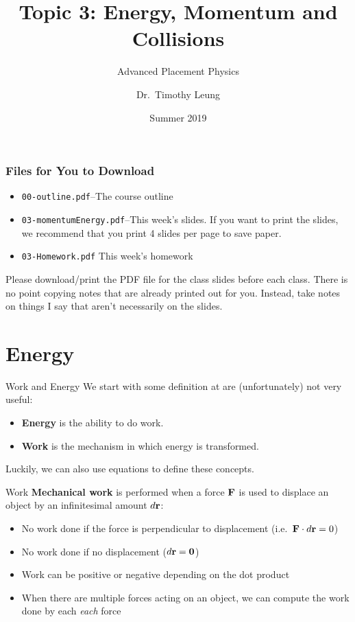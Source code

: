\documentclass[12pt,compress,aspectratio=169]{beamer}
\title{Topic 3: Energy, Momentum and Collisions}
\subtitle{Advanced Placement Physics}
\author[TML]{Dr.\ Timothy Leung}
\institute{Olympiads School}
\date{Summer 2019}
\newcommand{\mb}[1]{\ensuremath\mathbf{#1}}
\newcommand{\eq}[2]{\vspace{#1}{\Large\begin{displaymath}#2\end{displaymath}}}
\begin{document}
\begin{frame}
  \maketitle
\end{frame}

\begin{frame}
  \frametitle{Files for You to Download}
  \begin{itemize}
  \item\texttt{00-outline.pdf}--The course outline
  \item\texttt{03-momentumEnergy.pdf}--This week's slides. If you want to
    print the slides, we recommend that you print 4 slides per page to save
    paper.
  \item\texttt{03-Homework.pdf} This week's homework
  \end{itemize}
  Please download/print the PDF file for the class slides before each class.
  There is no point copying notes that are already printed out for you.
  Instead, take notes on things I say that aren't necessarily on the slides.
\end{frame}



\section{Energy}

\begin{frame}{Work and Energy}
  We start with some definition at are (unfortunately) not very useful:
  \begin{itemize}
    \item \textbf{Energy} is the ability to do work.
    \item \textbf{Work} is the mechanism in which energy is transformed.
  \end{itemize}
  Luckily, we can also use equations to define these concepts.
\end{frame}


\begin{frame}{Work}
  \textbf{Mechanical work} is performed when a force $\mb{F}$ is used to
  displace an object by an infinitesimal amount $d\mb{r}$:

  \eq{-.2in}{
    \boxed{W=\int_{r_1}^{r_2}\mb{F}(r)\cdot d\mb{r}}
  }

  \begin{itemize}
  \item No work done if the force is perpendicular to displacement
    (i.e.\ $\mb{F}\cdot d\mb{r}=0$)
  \item No work done if no displacement ($d\mb{r}=\mb{0}$)
  \item Work can be positive or negative depending on the dot product
  \item When there are multiple forces acting on an object, we can compute the
    work done by each \emph{each} force
  \end{itemize}
\end{frame}
\end{document}
